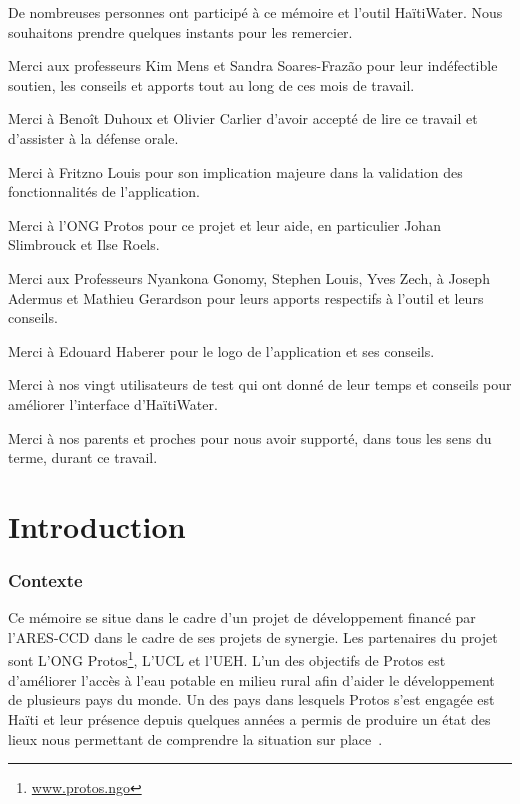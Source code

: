 \documentclass{EPL-master-thesis-covers-FR}
\begin{document}
		De nombreuses personnes ont participé à ce mémoire et l'outil HaïtiWater. Nous souhaitons prendre quelques instants pour les remercier.

		Merci aux professeurs Kim Mens et Sandra Soares-Frazão pour leur indéfectible soutien, les conseils et apports tout au long de ces mois de travail.

		Merci à Benoît Duhoux et Olivier Carlier d'avoir accepté de lire ce travail et d'assister à la défense orale.

		Merci à Fritzno Louis pour son implication majeure dans la validation des fonctionnalités de l'application.

		Merci à l'ONG Protos pour ce projet et leur aide, en particulier Johan Slimbrouck et Ilse Roels.

		Merci aux Professeurs Nyankona Gonomy, Stephen Louis, Yves Zech, à Joseph Adermus et Mathieu Gerardson pour leurs apports respectifs à l'outil et leurs conseils.

		Merci à Edouard Haberer pour le logo de l'application et ses conseils.

		Merci à nos vingt utilisateurs de test qui ont donné de leur temps et conseils pour améliorer l'interface d'HaïtiWater.

		Merci à nos parents et proches pour nous avoir supporté, dans tous les sens du terme, durant ce travail.

	\chapter{Introduction}



		\subsection*{Contexte}

			Ce mémoire se situe dans le cadre d'un projet de développement financé par l'ARES-CCD dans le cadre de ses projets de synergie. Les partenaires du projet sont L'ONG Protos\footnote{\href{https://www.protos.ngo/fr/}{www.protos.ngo}}, L'UCL et l'UEH. L'un des objectifs de Protos est d'améliorer l'accès à l'eau potable en milieu rural afin d'aider le développement de plusieurs pays du monde. Un des pays dans lesquels Protos s'est engagée est Haïti et leur présence depuis quelques années a permis de produire un état des lieux nous permettant de comprendre la situation sur place~\cite{ref:analyse_contextuelle_commune}.
\end{document}
